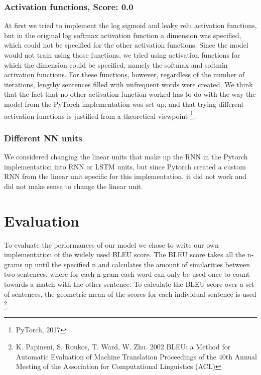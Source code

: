 \documentclass[11pt]{article}
\begin{document}
\subsubsection*{Activation functions, Score: 0.0}
At first we tried to implement the log sigmoid and leaky relu activation functions, but in the original log softmax activation function a dimension was specified, which could not be specified for the other activation functions. Since the model would not train using those functions, we tried using activation functions for which the dimension could be specified, namely the softmax and softmin activation functions. For these functions, however, regardless of the number of iterations, lengthy sentences filled with unfrequent words were created. We think that the fact that no other activation function worked has to do with the way the model from the PyTorch implementation was set up, and that trying different activation functions is justified from a theoretical viewpoint \footnote[11]{PyTorch, 2017}.

\subsubsection*{Different NN units}
We considered changing the linear units that make up the RNN in the Pytorch implementation into RNN or LSTM units, but since Pytorch created a custom RNN from the linear unit specific for this implementation, it did not work and did not make sense to change the linear unit.

\section{Evaluation}
To evaluate the performances of our model we chose to write our own implementation of the widely used BLEU score. The BLEU score takes all the n-grams up until the specified n and calculates the amount of similarities between two sentences, where for each n-gram each word can only be used once to count towards a match with the other sentence. To calculate the BLEU score over a set of sentences, the geometric mean of the scores for each individual sentence is used \footnote[12]{K. Papineni, S. Roukos, T. Ward, W. Zhu. 2002 BLEU: a Method for Automatic Evaluation of Machine Translation Proceedings of the 40th Annual Meeting of the Association for Computational Linguistics (ACL)}.
\end{document}
